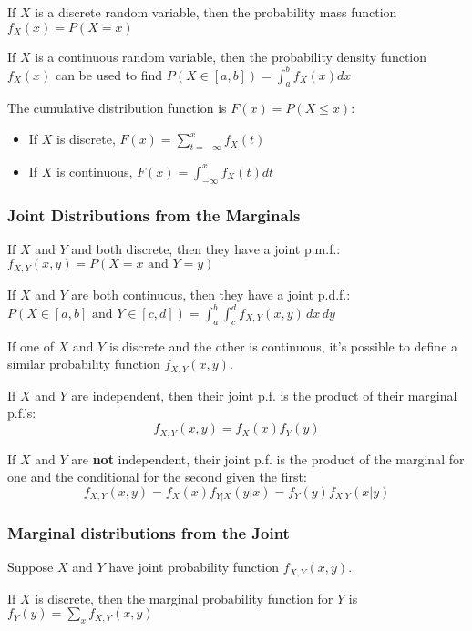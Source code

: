 \documentclass[]{article}
\begin{document}
If \(X\) is a discrete random variable, then the probability mass
function \(f_X(x) = P(X = x)\)

If \(X\) is a continuous random variable, then the probability density
function \(f_X(x)\) can be used to find
\(P(X \in [a, b]) = \int_{a}^b f_X(x) dx\)

The cumulative distribution function is \(F(x) = P(X \leq x)\):

\begin{itemize}
\item If $X$ is discrete, $F(x) = \sum_{t = -\infty}^x f_X(t)$
\item If $X$ is continuous, $F(x) = \int_{-\infty}^x f_X(t) d t$
\end{itemize}

\subsubsection{Joint Distributions from the
Marginals}\label{joint-distributions-from-the-marginals}

If \(X\) and \(Y\) and both discrete, then they have a joint p.m.f.:
\(f_{X,Y}(x, y) = P(X =x \text{ and } Y = y)\)

If \(X\) and \(Y\) are both continuous, then they have a joint p.d.f.:
\(P(X \in [a, b] \text{ and } Y \in [c, d]) = \int_{a}^b \int_{c}^d f_{X,Y}(x, y) \, dx \, dy\)

If one of \(X\) and \(Y\) is discrete and the other is continuous, it's
possible to define a similar probability function \(f_{X,Y}(x, y)\).

If \(X\) and \(Y\) are independent, then their joint p.f. is the product
of their marginal p.f.'s: \[f_{X,Y}(x,y) = f_X(x) f_Y(y)\]

If \(X\) and \(Y\) are \textbf{not} independent, their joint p.f. is the
product of the marginal for one and the conditional for the second given
the first:
\[f_{X,Y}(x,y) = f_X(x) f_{Y|X}(y | x) = f_Y(y) f_{X|Y}(x | y)\]

\subsubsection{Marginal distributions from the
Joint}\label{marginal-distributions-from-the-joint}

Suppose \(X\) and \(Y\) have joint probability function
\(f_{X,Y}(x, y)\).

If \(X\) is discrete, then the marginal probability function for \(Y\)
is \(f_Y(y) = \sum_x f_{X,Y}(x, y)\)
\end{document}
